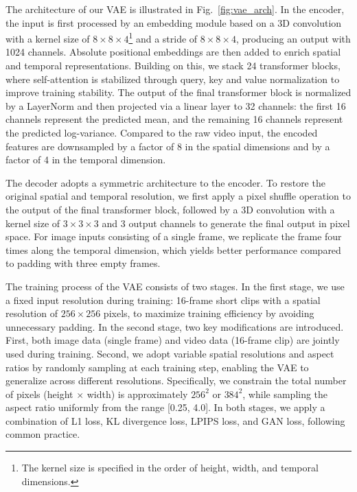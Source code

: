 The architecture of our VAE is illustrated in Fig.~\ref{fig:vae_arch}. In the encoder, the input is first processed by an embedding module based on a 3D convolution with a kernel size of $8 \times 8 \times 4$\footnote{The kernel size is specified in the order of height, width, and temporal dimensions.} and a stride of $8 \times 8 \times 4$, producing an output with 1024 channels. Absolute positional embeddings are then added to enrich spatial and temporal representations. Building on this, we stack 24 transformer blocks, where self-attention is stabilized through query, key and value normalization to improve training stability. The output of the final transformer block is normalized by a LayerNorm and then projected via a linear layer to 32 channels: the first 16 channels represent the predicted mean, and the remaining 16 channels represent the predicted log-variance. Compared to the raw video input, the encoded features are downsampled by a factor of 8 in the spatial dimensions and by a factor of 4 in the temporal dimension.

The decoder adopts a symmetric architecture to the encoder. To restore the original spatial and temporal resolution, we first apply a pixel shuffle operation to the output of the final transformer block, followed by a 3D convolution with a kernel size of $3 \times 3 \times 3$ and 3 output channels to generate the final output in pixel space. For image inputs consisting of a single frame, we replicate the frame four times along the temporal dimension, which yields better performance compared to padding with three empty frames.



The training process of the VAE consists of two stages.
In the first stage, we use a fixed input resolution during training: 16-frame short clips with a spatial resolution of $256\times256$ pixels, to maximize training efficiency by avoiding unnecessary padding. In the second stage, two key modifications are introduced. First, both image data (single frame) and video data (16-frame clip) are jointly used during training. Second, we adopt variable spatial resolutions and aspect ratios by randomly sampling at each training step, enabling the VAE to generalize across different resolutions. Specifically, we constrain the total number of pixels (height $\times$ width) is approximately $256^2$ or $384^2$, while sampling the aspect ratio uniformly from the range [0.25, 4.0].
In both stages, we apply a combination of L1 loss, KL divergence loss, LPIPS loss, and GAN loss, following common practice.

